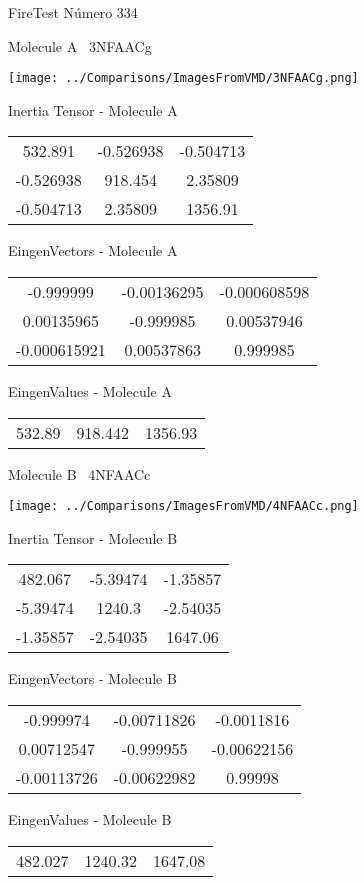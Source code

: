 \vtab[-3cm]
\begin{center}
{\large FireTest \tab Número 334}
\end{center}
\begin{multicols}{2}
\begin{center}

Molecule A \
3NFAACg

\texttt{[image: ../Comparisons/ImagesFromVMD/3NFAACg.png]}

Inertia Tensor - Molecule A \\
\begin{tabular}{|c c c|}
532.891	 & 	-0.526938	 & 	-0.504713	 \\
-0.526938	 & 	918.454	 & 	2.35809	 \\
-0.504713	 & 	2.35809	 & 	1356.91
\end{tabular}

\vtab
 EingenVectors - Molecule A     \\
\begin{tabular}{|c c c|}
-0.999999	 & 	-0.00136295	 & 	-0.000608598	 \\
0.00135965	 & 	-0.999985	 & 	0.00537946	 \\
-0.000615921	 & 	0.00537863	 & 	0.999985
\end{tabular}

\vtab
 EingenValues - Molecule A     \\
\begin{tabular}{|c c c|}
532.89	 & 	918.442	 & 	1356.93	 \\
\end{tabular}
\columnbreak

Molecule B \
4NFAACc

\texttt{[image: ../Comparisons/ImagesFromVMD/4NFAACc.png]}

Inertia Tensor - Molecule B \\
\begin{tabular}{|c c c|}
482.067	 & 	-5.39474	 & 	-1.35857	 \\
-5.39474	 & 	1240.3	 & 	-2.54035	 \\
-1.35857	 & 	-2.54035	 & 	1647.06
\end{tabular}

\vtab
 EingenVectors - Molecule B     \\
\begin{tabular}{|c c c|}
-0.999974	 & 	-0.00711826	 & 	-0.0011816	 \\
0.00712547	 & 	-0.999955	 & 	-0.00622156	 \\
-0.00113726	 & 	-0.00622982	 & 	0.99998
\end{tabular}

\vtab
 EingenValues - Molecule B     \\
\begin{tabular}{|c c c|}
482.027	 & 	1240.32	 & 	1647.08	 \\
\end{tabular}

\end{center}
\end{multicols}

